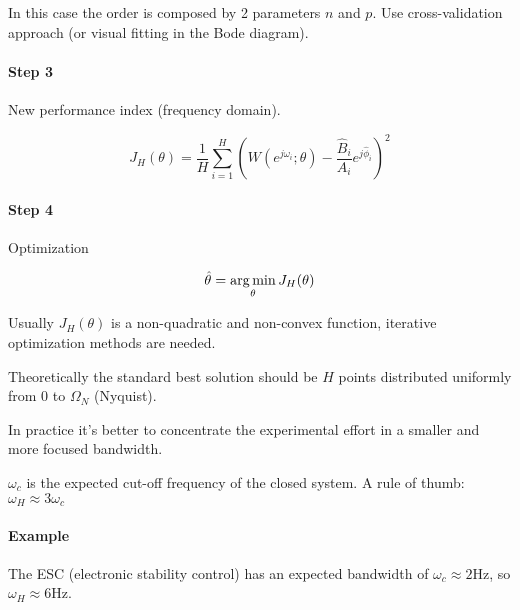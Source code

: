 \begin{remark}
    In this case the order is composed by 2 parameters $n$ and $p$.
    Use cross-validation approach (or visual fitting in the Bode diagram).
\end{remark}

\paragraph{Step 3} New performance index (frequency domain).

\[
    J_H(\theta) = \frac{1}{H} \sum_{i=1}^H \left(W(e^{j\omega_i}; \theta) - \frac{\hat{B}_i}{A_i}e^{j\hat{\phi}_i} \right)^2
\]

\paragraph{Step 4} Optimization

\[
    \hat{\theta} = \operatorname*{arg\,min}_\theta J_H(\theta)
\]

Usually $J_H(\theta)$ is a non-quadratic and non-convex function, iterative optimization methods are needed.

\begin{remark}[Frequency bandwidth selection $\omega_H =\; ?$]
    Theoretically the standard best solution should be $H$ points distributed uniformly from 0 to $\Omega_N$ (Nyquist).

    In practice it's better to concentrate the experimental effort in a smaller and more focused bandwidth.

    \begin{figure}[H]
        \centering
    \end{figure}

    $\omega_c$ is the expected cut-off frequency of the closed system.
    A rule of thumb: $\omega_H \approx 3\omega_c$

    \paragraph{Example} The ESC (electronic stability control) has an expected bandwidth of $\omega_c \approx 2 \text{Hz}$, so $\omega_H \approx 6\text{Hz}$.
\end{remark}

